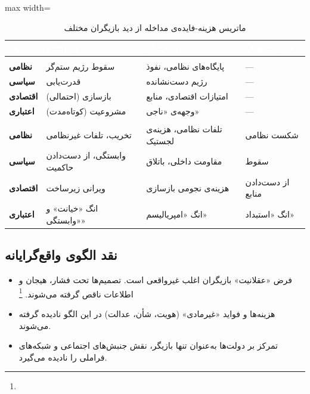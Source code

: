 \begin{table}[htbp]
\centering
\caption{ماتریس هزینه-فایده‌ی مداخله از دید بازیگران مختلف}\label{tab:ch03-cost-benefit}
\begin{adjustbox}{max width=\linewidth}
\begin{tabular}{
  >{\raggedleft\arraybackslash\bfseries}p{2.5cm}
  >{\raggedleft\arraybackslash}p{3.5cm}
  >{\raggedleft\arraybackslash}p{3.5cm}
  >{\raggedleft\arraybackslash}p{3.5cm}}
\toprule
\rowcolor{PrimaryDeep}
\textcolor{white}{بُعد} &
\textcolor{white}{دعوت‌کننده} &
\textcolor{white}{مداخله‌گر} &
\textcolor{white}{حکومت هدف} \\
\midrule

\multicolumn{4}{r}{\cellcolor{AccentGreen!15}\textbf{\color{AccentGreen}فواید بالقوه}} \\
\midrule
نظامی &
سقوط رژیم ستم‌گر &
پایگاه‌های نظامی، نفوذ &
— \\
\rowcolor{NeutralLight}
سیاسی &
قدرت‌یابی &
رژیم دست‌نشانده &
— \\
اقتصادی &
بازسازی (احتمالی) &
امتیازات اقتصادی، منابع &
— \\
\rowcolor{NeutralLight}
اعتباری &
مشروعیت (کوتاه‌مدت) &
وجهه‌ی «ناجی» &
— \\

\midrule
\multicolumn{4}{r}{\cellcolor{AccentRed!15}\textbf{\color{AccentRed}هزینه‌های بالقوه}} \\
\midrule
نظامی &
تخریب، تلفات غیرنظامی &
تلفات نظامی، هزینه‌ی لجستیک &
شکست نظامی \\
\rowcolor{NeutralLight}
سیاسی &
وابستگی، از دست‌دادن حاکمیت &
مقاومت داخلی، باتلاق &
سقوط \\
اقتصادی &
ویرانی زیرساخت &
هزینه‌ی نجومی بازسازی &
از دست‌دادن منابع \\
\rowcolor{NeutralLight}
اعتباری &
انگ «خیانت» و «وابستگی» &
انگ «امپریالیسم» &
انگ «استبداد» \\

\bottomrule
\end{tabular}
\end{adjustbox}
\end{table}

\subsection{نقد الگوی واقع‌گرایانه}
\label{subsec:ch03-realist-critique}

\begin{itemize}[nosep, rightmargin=1em]
  \item فرض «عقلانیت» بازیگران اغلب غیرواقعی است. تصمیم‌ها تحت فشار، هیجان و اطلاعات ناقص گرفته می‌شوند.%
  \footnote{}
  \item هزینه‌ها و فواید «غیرمادی» (هویت، شأن، عدالت) در این الگو نادیده گرفته می‌شوند.
  \item تمرکز بر دولت‌ها به‌عنوان تنها بازیگر، نقش جنبش‌های اجتماعی و شبکه‌های فراملی را نادیده می‌گیرد.
\end{itemize}

